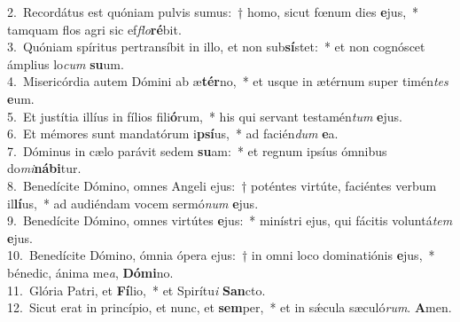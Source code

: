 {2.~}Recordátus est quóniam pulvis sumus:~† homo, sicut fœnum dies \textbf{e}jus,~* tamquam flos agri sic ef\textit{flo}\textbf{ré}bit.\\
{3.~}Quóniam spíritus pertransíbit in illo, et non sub\textbf{sí}stet:~* et non cognóscet ámplius lo\textit{cum} \textbf{su}um.\\
{4.~}Misericórdia autem Dómini ab æ\textbf{tér}no,~* et usque in ætérnum super timén\textit{tes} \textbf{e}um.\\
{5.~}Et justítia illíus in fílios fili\textbf{ó}rum,~* his qui servant testamén\textit{tum} \textbf{e}jus.\\
{6.~}Et mémores sunt mandatórum i\textbf{psí}us,~* ad facién\textit{dum} \textbf{e}a.\\
{7.~}Dóminus in cælo parávit sedem \textbf{su}am:~* et regnum ipsíus ómnibus do\textit{mi}\textbf{ná}\textbf{bi}tur.\\
{8.~}Benedícite Dómino, omnes Angeli ejus:~† poténtes virtúte, faciéntes verbum il\textbf{lí}us,~* ad audiéndam vocem sermó\textit{num} \textbf{e}jus.\\
{9.~}Benedícite Dómino, omnes virtútes \textbf{e}jus:~* minístri ejus, qui fácitis voluntá\textit{tem} \textbf{e}jus.\\
{10.~}Benedícite Dómino, ómnia ópera ejus:~† in omni loco dominatiónis \textbf{e}jus,~* bénedic, ánima me\textit{a}, \textbf{Dó}\textbf{mi}no.\\
{11.~}Glória Patri, et \textbf{Fí}lio,~* et Spirítu\textit{i} \textbf{San}cto.\\
{12.~}Sicut erat in princípio, et nunc, et \textbf{sem}per,~* et in sǽcula sæculó\textit{rum}. \textbf{A}men.\\
